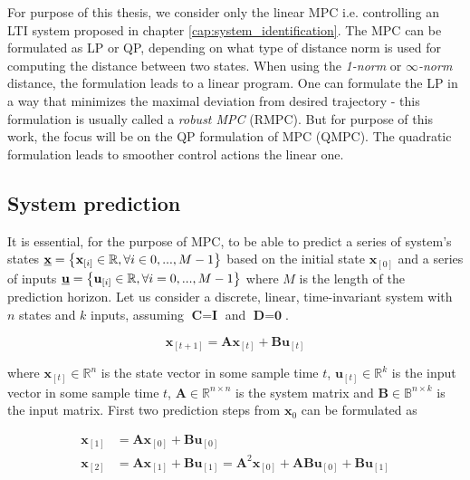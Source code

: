 For purpose of this thesis, we consider only the linear MPC i.e. controlling an LTI system proposed in chapter \ref{cap:system_identification}. The MPC can be formulated as LP or QP, depending on what type of distance norm is used for computing the distance between two states. When using the \mbox{\emph{1-norm}} or \mbox{\emph{$\infty$-norm}} distance, the formulation leads to a linear program. One can formulate the LP in a way that minimizes the maximal deviation from desired trajectory - this formulation is usually called a \emph{robust MPC} (RMPC). But for purpose of this work, the focus will be on the QP formulation of MPC (QMPC). The quadratic formulation leads to smoother control actions the linear one.

\subsection{System prediction}

It is essential, for the purpose of MPC, to be able to predict a series of system's states $\textbf{\underline{x}} = \left\lbrace \textbf{x}_{[i]} \in \mathbb{R}, \forall i \in 0, ..., M-1 \right\rbrace$ based on the initial state $\textbf{x}_{[0]}$ and a series of inputs $\textbf{\underline{u}} = \left\lbrace \textbf{u}_{[i]} \in \mathbb{R}, \forall i = 0, ..., M-1 \right\rbrace$ where $M$ is the length of the prediction horizon. Let us consider a discrete, linear, time-invariant system with $n$ states and $k$ inputs, assuming $\textbf{C} = \textbf{I}$ and $\textbf{D} = \textbf{0}$.

\begin{equation}
\textbf{x}_{[t+1]} = \textbf{A}\textbf{x}_{[t]} + \textbf{B}\textbf{u}_{[t]}
\label{eq:mpc_lti_system}
\end{equation}

where $\textbf{x}_{[t]} \in \mathbb{R}^{n}$ is the state vector in some sample time $t$, $\textbf{u}_{[t]} \in \mathbb{R}^k$ is the input vector in some sample time $t$, $\textbf{A} \in \mathbb{R}^{n\times n}$ is the system matrix and $\textbf{B} \in \mathbb{B}^{n\times k}$ is the input matrix. First two prediction steps from $\textbf{x}_0$ can be formulated as

\begin{equation}
\begin{split}
\textbf{x}_{[1]} &= \textbf{A}\textbf{x}_{[0]} + \textbf{B}\textbf{u}_{[0]} \\
\textbf{x}_{[2]} &= \textbf{A}\textbf{x}_{[1]} + \textbf{B}\textbf{u}_{[1]} = \textbf{A}^2\textbf{x}_{[0]} + \textbf{A}\textbf{B}\textbf{u}_{[0]} + \textbf{B}\textbf{u}_{[1]}
\end{split}
\end{equation}

